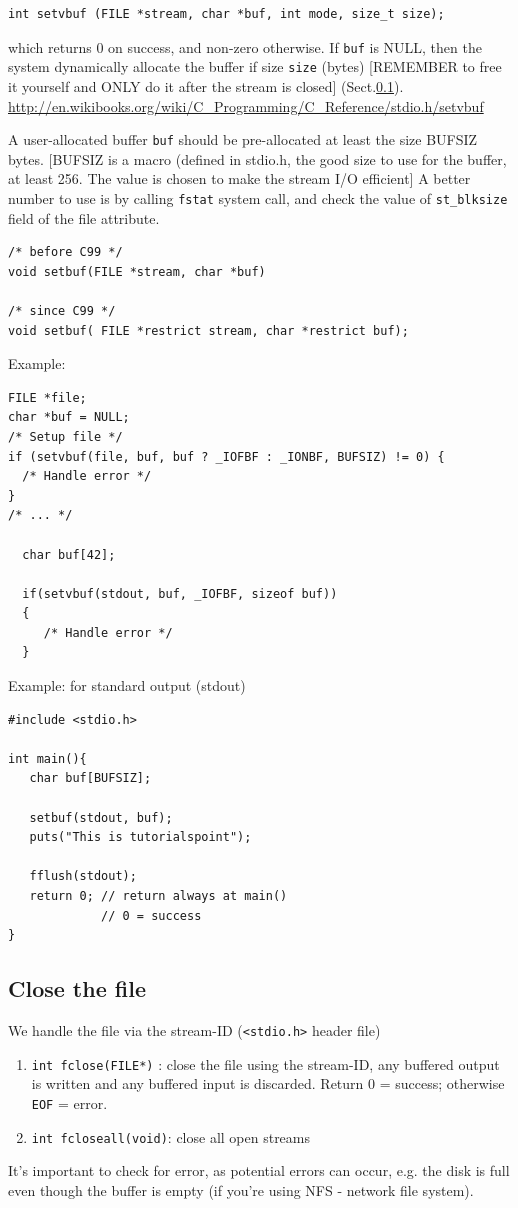\begin{lstlisting}
int setvbuf (FILE *stream, char *buf, int mode, size_t size);
\end{lstlisting}
which returns 0 on success, and non-zero otherwise. If \verb!buf! is NULL, then
the system dynamically allocate the buffer if size \verb!size! (bytes)
[REMEMBER to free it yourself and ONLY do it after the stream is closed]
(Sect.\ref{sec:FILE_close}).
\url{http://en.wikibooks.org/wiki/C_Programming/C_Reference/stdio.h/setvbuf}


A user-allocated buffer \verb!buf! should be pre-allocated at least the size
BUFSIZ bytes. [BUFSIZ is a macro (defined in stdio.h, the good size to use for
the buffer, at least 256. The value is chosen to make the stream I/O efficient]
A better number to use is by calling \verb!fstat! system call, and check the
value of \verb!st_blksize! field of the file attribute.

\begin{verbatim}
/* before C99 */
void setbuf(FILE *stream, char *buf)

/* since C99 */
void setbuf( FILE *restrict stream, char *restrict buf);
\end{verbatim}


Example:
\begin{lstlisting}
FILE *file;
char *buf = NULL;
/* Setup file */
if (setvbuf(file, buf, buf ? _IOFBF : _IONBF, BUFSIZ) != 0) {
  /* Handle error */
}
/* ... */

  char buf[42];
 
  if(setvbuf(stdout, buf, _IOFBF, sizeof buf))
  {
     /* Handle error */
  }
\end{lstlisting}

Example: for standard output (stdout)
\begin{Verbatim}
#include <stdio.h>

int main(){
   char buf[BUFSIZ];

   setbuf(stdout, buf);
   puts("This is tutorialspoint");

   fflush(stdout);
   return 0; // return always at main()
             // 0 = success
}
\end{Verbatim}

\subsection{Close the file}
\label{sec:FILE_close}

We handle the file via the stream-ID (\verb!<stdio.h>! header file)
\begin{enumerate}
  \item \verb!int fclose(FILE*)! : close the file using the stream-ID, any
  buffered output is written and any buffered input is discarded. Return 0 =
  success; otherwise \verb!EOF! = error. 
  
  \item \verb!int fcloseall(void)!: close all open streams
\end{enumerate}
It's important to check for error, as potential errors can occur, e.g. the disk
is full even though the buffer is empty (if you're using NFS - network file
system). 

